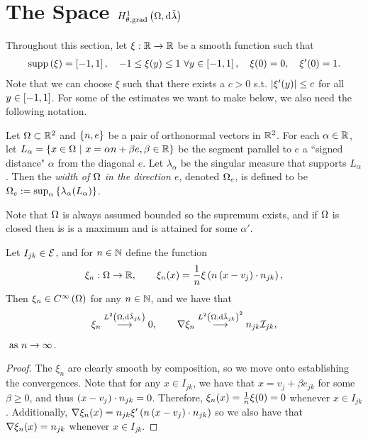 \section{The Space $H^1_{\theta, \mathrm{grad}}\left( \Omega, \mathrm{d}\tilde{\lambda} \right)$} \label{sec:CompSobSpaces}

Throughout this section, let $\xi:\mathbb{R}\rightarrow\mathbb{R}$ be a smooth function such that
\begin{align*}
	\mathrm{supp}\left( \xi \right) = \left[ -1,1 \right], \quad -1\leq\xi(y)\leq1 \ \forall y\in\left[ -1,1 \right], \quad \xi(0)=0, \quad \xi'(0)=1.
\end{align*}
Note that we can choose $\xi$ such that there exists a $c>0$ s.t. $\left\lvert \xi'(y) \right\rvert\leq c$ for all $y\in\left[ -1,1 \right]$.
For some of the estimates we want to make below, we also need the following notation.
\begin{definition}
	Let $\Omega\subset\mathbb{R}^2$ and $\left\{ n, e \right\}$ be a pair of orthonormal vectors in $\mathbb{R}^2$.
	For each $\alpha\in\mathbb{R}$, let $L_{\alpha} = \left\{ x\in\Omega \ \middle\vert \  x = \alpha n + \beta e, \beta\in\mathbb{R} \right\}$ be the segment parallel to $e$ a ``signed distance" $\alpha$ from the diagonal $e$.
	Let $\lambda_{\alpha}$ be the singular measure that supports $L_{\alpha}$.
	Then the \emph{width of $\Omega$ in the direction $e$}, denoted $\Omega_e$, is defined to be $\Omega_e := \sup_{\alpha}\left\{ \lambda_{\alpha}(L_{\alpha}) \right\}$.
\end{definition}
Note that $\Omega$ is always assumed bounded so the supremum exists, and if $\Omega$ is closed then is is a maximum and is attained for some $\alpha'$.

\begin{lemma}
	Let $I_{jk}\in\mathcal{E}$, and for $n\in\mathbb{N}$ define the function
	\begin{align*}
		\xi_n:\Omega\rightarrow\mathbb{R}, \qquad \xi_n(x) = \frac{1}{n}\xi\left( n\left( x-v_j \right)\cdot n_{jk} \right),
	\end{align*}
	Then $\xi_n\in C^{\infty}\left( \Omega \right)$ for any $n\in\mathbb{N}$, and we have that
	\begin{align*}
		\xi_n \overset{L^{2}\left( \Omega,\mathrm{d}\tilde{\lambda}_{jk} \right)}{\longrightarrow} 0, \qquad
		\nabla\xi_n \overset{L^{2}\left( \Omega,\mathrm{d}\tilde{\lambda}_{jk} \right)^2}{\longrightarrow} n_{jk}\mathcal{I}_{jk},
	\end{align*}
	$\ \text{as} \ n \rightarrow\infty$.
\end{lemma}
\begin{proof}
	The $\xi_n$ are clearly smooth by composition, so we move onto establishing the convergences.
	Note that for any $x\in I_{jk}$, we have that $x = v_j + \beta e_{jk}$ for some $\beta\geq0$, and thus $\left( x-v_j \right)\cdot n_{jk} = 0$.
	Therefore, $\xi_n(x) = \frac{1}{n}\xi(0) = 0$ whenever $x\in I_{jk}$.
	Additionally, $\nabla\xi_n(x) = n_{jk}\xi'\left( n\left( x-v_j \right)\cdot n_{jk} \right)$ so we also have that $\nabla\xi_n(x) = n_{jk}$ whenever $x\in I_{jk}$.
\end{proof}